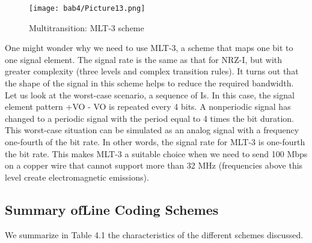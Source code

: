 \begin{figure}
  \centering
  \texttt{[image: bab4/Picture13.png]}
  \caption{Multitransition: MLT-3 scheme}
  \label{fig4:13}
\end{figure}

One might wonder why we need to use MLT-3, a scheme that maps one bit to one signal element. The signal rate is the same as that for NRZ-I, but with greater complexity (three levels and complex transition rules). It turns out that the shape of the signal in this scheme helps to reduce the required bandwidth. Let us look at the worst-case scenario, a sequence of Is. In this case, the signal element pattern +VO - VO is repeated every 4 bits. A nonperiodic signal has changed to a periodic signal with the period equal to 4 times the bit duration. This worst-case situation can be simulated as an analog signal with a frequency one-fourth of the bit rate. In other words, the signal rate for MLT-3 is one-fourth the bit rate. This makes MLT-3 a suitable choice when we need to send 100 Mbps on a copper wire that cannot support more than 32 MHz (frequencies above this level create electromagnetic emissions).

\subsection*{Summary ofLine Coding Schemes}
We summarize in Table 4.1 the characteristics of the different schemes discussed.

